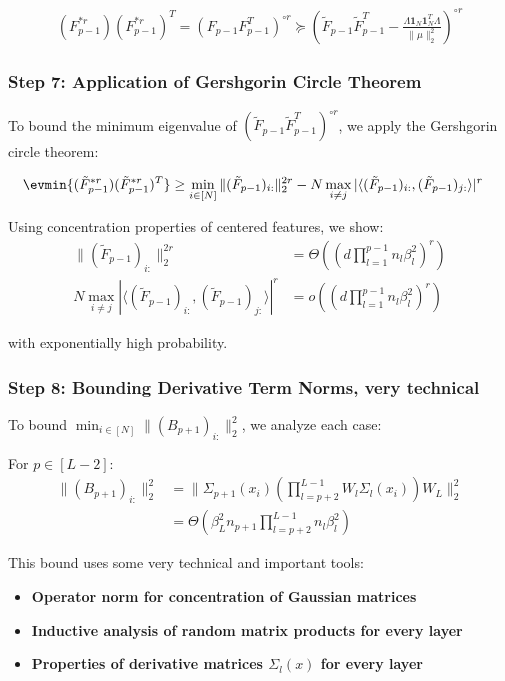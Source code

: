\documentclass[a4paper]{article}
\theoremstyle{plain}
\theoremstyle{definition}
\theoremstyle{remark}
\begin{document}
\begin{align}
(F_{p-1}^{*r})(F_{p-1}^{*r})^T = (F_{p-1}F_{p-1}^T)^{\circ r} \succeq \left(\tilde{F}_{p-1}\tilde{F}_{p-1}^T - \frac{\Lambda \mathbf{1}_N \mathbf{1}_N^T \Lambda}{\|\mu\|_2^2}\right)^{\circ r}
\end{align}

\subsubsection{Step 7: Application of Gershgorin Circle Theorem}

To bound the minimum eigenvalue of $(\tilde{F}_{p-1}\tilde{F}_{p-1}^T)^{\circ r}$, we apply the Gershgorin circle theorem:

\begin{align}
\evmin{(\tilde{F}_{p-1}^{*r})(\tilde{F}_{p-1}^{*r})^T} &\geq \min_{i \in [N]} \|(\tilde{F}_{p-1})_{i:}\|_2^{2r} - N \max_{i \neq j} |\langle (\tilde{F}_{p-1})_{i:}, (\tilde{F}_{p-1})_{j:} \rangle|^r
\end{align}

Using concentration properties of centered features, we show:
\begin{align}
\|(\tilde{F}_{p-1})_{i:}\|_2^{2r} &= \Theta\left(\left(d \prod_{l=1}^{p-1} n_l \beta_l^2\right)^r\right) \\
N \max_{i \neq j} |\langle (\tilde{F}_{p-1})_{i:}, (\tilde{F}_{p-1})_{j:} \rangle|^r &= o\left(\left(d \prod_{l=1}^{p-1} n_l \beta_l^2\right)^r\right)
\end{align}

with exponentially high probability.

\subsubsection{Step 8: Bounding Derivative Term Norms, very technical}

To bound $\min_{i \in [N]} \|(B_{p+1})_{i:}\|_2^2$, we analyze each case:

For $p \in [L-2]$:
\begin{align}
\|(B_{p+1})_{i:}\|_2^2 &= \|\Sigma_{p+1}(x_i) \left(\prod_{l=p+2}^{L-1} W_l \Sigma_l(x_i)\right) W_L\|_2^2 \\
&= \Theta\left(\beta_L^2 n_{p+1} \prod_{l=p+2}^{L-1} n_l \beta_l^2\right)
\end{align}

This bound uses some very technical and important tools:
\begin{itemize}
    \item \textbf{Operator norm for  concentration of Gaussian matrices}
    \item \textbf{Inductive analysis of random matrix products for every layer}
    \item \textbf{Properties of derivative matrices $\Sigma_l(x)$ for every layer}
\end{itemize}
\end{document}
